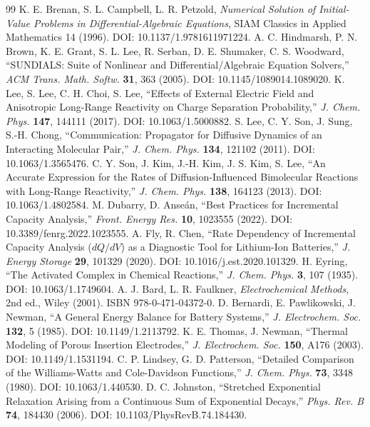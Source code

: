 \documentclass[11pt,a4paper]{article}
\newcommand{\brk}{\discretionary{}{}{}}%
\begin{document}
\begin{thebibliography}{99}
 K. E. Brenan, S. L. Campbell, L. R. Petzold, \emph{Numerical Solution of Initial-Value
  Problems in Differential-Algebraic Equations}, SIAM Classics in Applied Mathematics 14 (1996).
  DOI: 10.1137/\brk 1.9781611971224.
 A. C. Hindmarsh, P. N. Brown, K. E. Grant, S. L. Lee, R. Serban, D. E. Shumaker,
  C. S. Woodward, ``SUNDIALS: Suite of Nonlinear and Differential/Algebraic Equation Solvers,''
  \emph{ACM Trans. Math. Softw.} \textbf{31}, 363 (2005). DOI: 10.1145/\brk 1089014.1089020.
 K. Lee, S. Lee, C. H. Choi, S. Lee, ``Effects of External Electric Field and Anisotropic
  Long-Range Reactivity on Charge Separation Probability,'' \emph{J. Chem. Phys.} \textbf{147}, 144111
  (2017). DOI: 10.1063/\brk 1.5000882.
 S. Lee, C. Y. Son, J. Sung, S.-H. Chong, ``Communication: Propagator for Diffusive
  Dynamics of an Interacting Molecular Pair,'' \emph{J. Chem. Phys.} \textbf{134}, 121102 (2011).
  DOI: 10.1063/\brk 1.3565476.
 C. Y. Son, J. Kim, J.-H. Kim, J. S. Kim, S. Lee, ``An Accurate Expression for the Rates
  of Diffusion-Influenced Bimolecular Reactions with Long-Range Reactivity,'' \emph{J. Chem. Phys.}
  \textbf{138}, 164123 (2013). DOI: 10.1063/\brk 1.4802584.
 M. Dubarry, D. Anse\'an, ``Best Practices for Incremental Capacity Analysis,''
  \emph{Front. Energy Res.} \textbf{10}, 1023555 (2022). DOI: 10.3389/\brk fenrg.2022.1023555.
 A. Fly, R. Chen, ``Rate Dependency of Incremental Capacity Analysis ($dQ/dV$) as a
  Diagnostic Tool for Lithium-Ion Batteries,'' \emph{J. Energy Storage} \textbf{29}, 101329 (2020).
  DOI: 10.1016/\brk j.est.2020.101329.
 H. Eyring, ``The Activated Complex in Chemical Reactions,'' \emph{J. Chem. Phys.}
  \textbf{3}, 107 (1935). DOI: 10.1063/\brk 1.1749604.
 A. J. Bard, L. R. Faulkner, \emph{Electrochemical Methods}, 2nd ed., Wiley (2001).
  ISBN 978-0-\brk 471-04372-0.
 D. Bernardi, E. Pawlikowski, J. Newman, ``A General Energy Balance for Battery
  Systems,'' \emph{J. Electrochem. Soc.} \textbf{132}, 5 (1985). DOI: 10.1149/\brk 1.2113792.
 K. E. Thomas, J. Newman, ``Thermal Modeling of Porous Insertion Electrodes,''
  \emph{J. Electrochem. Soc.} \textbf{150}, A176 (2003). DOI: 10.1149/\brk 1.1531194.
 C. P. Lindsey, G. D. Patterson, ``Detailed Comparison of the Williams-Watts and
  Cole-Davidson Functions,'' \emph{J. Chem. Phys.} \textbf{73}, 3348 (1980). DOI: 10.1063/\brk 1.440530.
 D. C. Johnston, ``Stretched Exponential Relaxation Arising from a Continuous Sum
  of Exponential Decays,'' \emph{Phys. Rev. B} \textbf{74}, 184430 (2006). DOI: 10.1103/\brk PhysRevB.74.184430.
\end{thebibliography}
\end{document}
